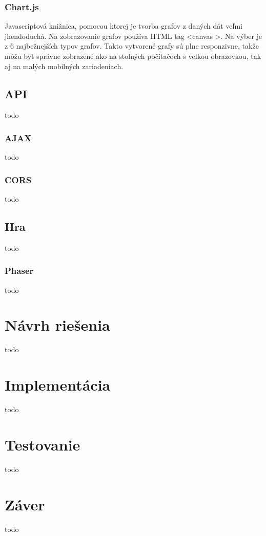 \subsection{Chart.js}
Javascriptová knižnica, pomocou ktorej je tvorba grafov z daných dát veľmi jhendoduchá. Na zobrazovanie grafov používa HTML tag <canvas >. Na výber je z 6 najbežnejších typov grafov. Takto vytvorené grafy sú plne responzivne, takže môžu byť správne zobrazené ako na stolných počítačoch s veľkou obrazovkou, tak aj na malých mobilných zariadeniach.

\section{API}
todo

\subsection{AJAX}
todo

\subsection{CORS}
todo

\section{Hra}
todo

\subsection{Phaser}
todo

\chapter{Návrh riešenia}
todo

\chapter{Implementácia}
todo

\chapter{Testovanie}
todo

\chapter{Záver}
todo












